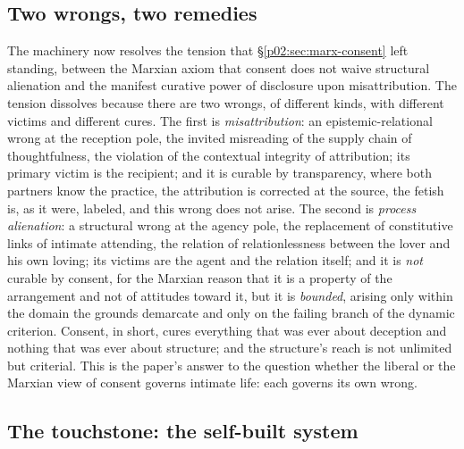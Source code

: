 \documentclass[11pt,a4paper]{article}
\newcommand{\term}[1]{\textit{\textcolor{pinkitalic}{#1}}}
\begin{document}
\subsection{Two wrongs, two remedies}
\label{p02:sec:synthesis-twowrongs}

The machinery now resolves the tension that \S\ref{p02:sec:marx-consent} left standing, between the Marxian axiom that consent does not waive structural alienation and the manifest curative power of disclosure upon misattribution. The tension dissolves because there are two wrongs, of different kinds, with different victims and different cures. The first is \term{misattribution}: an epistemic-relational wrong at the reception pole, the invited misreading of the supply chain of thoughtfulness, the violation of the contextual integrity of attribution; its primary victim is the recipient; and it is curable by transparency, where both partners know the practice, the attribution is corrected at the source, the fetish is, as it were, labeled, and this wrong does not arise. The second is \term{process alienation}: a structural wrong at the agency pole, the replacement of constitutive links of intimate attending, the relation of relationlessness between the lover and his own loving; its victims are the agent and the relation itself; and it is \emph{not} curable by consent, for the Marxian reason that it is a property of the arrangement and not of attitudes toward it, but it is \emph{bounded}, arising only within the domain the grounds demarcate and only on the failing branch of the dynamic criterion. Consent, in short, cures everything that was ever about deception and nothing that was ever about structure; and the structure's reach is not unlimited but criterial. This is the paper's answer to the question whether the liberal or the Marxian view of consent governs intimate life: each governs its own wrong.

\subsection{The touchstone: the self-built system}
\label{p02:sec:synthesis-touchstone}
\end{document}
